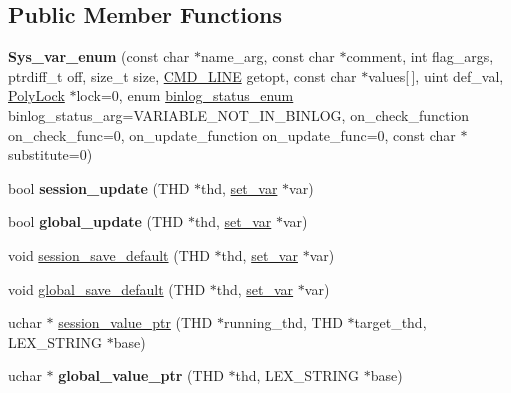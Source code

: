 \subsection*{Public Member Functions}
\begin{DoxyCompactItemize}
\item 
\mbox{\label{classSys__var__enum_aeadfaa0c771eb624225b2b7cd3cd08ac}} 
{\bfseries Sys\+\_\+var\+\_\+enum} (const char $\ast$name\+\_\+arg, const char $\ast$comment, int flag\+\_\+args, ptrdiff\+\_\+t off, size\+\_\+t size, \mbox{\hyperlink{structCMD__LINE}{C\+M\+D\+\_\+\+L\+I\+NE}} getopt, const char $\ast$values\mbox{[}$\,$\mbox{]}, uint def\+\_\+val, \mbox{\hyperlink{classPolyLock}{Poly\+Lock}} $\ast$lock=0, enum \mbox{\hyperlink{classsys__var_a664520ec82191888717c86085bfa83ce}{binlog\+\_\+status\+\_\+enum}} binlog\+\_\+status\+\_\+arg=V\+A\+R\+I\+A\+B\+L\+E\+\_\+\+N\+O\+T\+\_\+\+I\+N\+\_\+\+B\+I\+N\+L\+OG, on\+\_\+check\+\_\+function on\+\_\+check\+\_\+func=0, on\+\_\+update\+\_\+function on\+\_\+update\+\_\+func=0, const char $\ast$substitute=0)
\item 
\mbox{\label{classSys__var__enum_a18197ba01c66aa063d0192927d0a020f}} 
bool {\bfseries session\+\_\+update} (T\+HD $\ast$thd, \mbox{\hyperlink{classset__var}{set\+\_\+var}} $\ast$var)
\item 
\mbox{\label{classSys__var__enum_ae3205425f100ffcf5b886c803ee19c81}} 
bool {\bfseries global\+\_\+update} (T\+HD $\ast$thd, \mbox{\hyperlink{classset__var}{set\+\_\+var}} $\ast$var)
\item 
void \mbox{\hyperlink{classSys__var__enum_a6105ba8d79f076e7ad271449c3e44d2f}{session\+\_\+save\+\_\+default}} (T\+HD $\ast$thd, \mbox{\hyperlink{classset__var}{set\+\_\+var}} $\ast$var)
\item 
void \mbox{\hyperlink{classSys__var__enum_a92bd0f6a0c19af8b437fa2ee81c92c72}{global\+\_\+save\+\_\+default}} (T\+HD $\ast$thd, \mbox{\hyperlink{classset__var}{set\+\_\+var}} $\ast$var)
\item 
uchar $\ast$ \mbox{\hyperlink{classSys__var__enum_aebb9d186c88b597ef5f17f0d4c9130c6}{session\+\_\+value\+\_\+ptr}} (T\+HD $\ast$running\+\_\+thd, T\+HD $\ast$target\+\_\+thd, L\+E\+X\+\_\+\+S\+T\+R\+I\+NG $\ast$base)
\item 
\mbox{\label{classSys__var__enum_a7ba40070a261add6a67e0cac53e1c8cf}} 
uchar $\ast$ {\bfseries global\+\_\+value\+\_\+ptr} (T\+HD $\ast$thd, L\+E\+X\+\_\+\+S\+T\+R\+I\+NG $\ast$base)
\end{DoxyCompactItemize}
